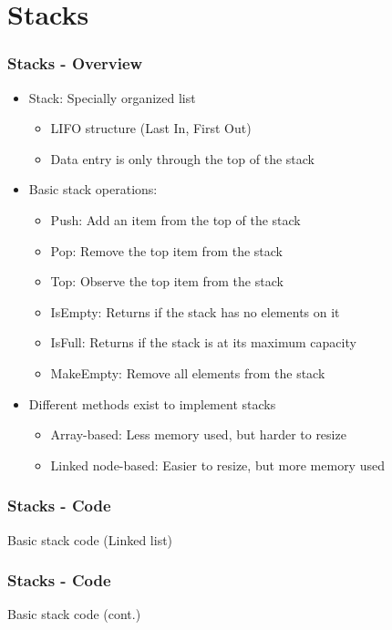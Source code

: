 \documentclass[c, aspectratio=169]{beamer}
\begin{document}
\section{Stacks}
\begin{frame}\frametitle{Stacks - Overview}
\begin{itemize}
\item Stack: Specially organized list
	\begin{itemize}
	\item LIFO structure (Last In, First Out)
	\item Data entry is only through the top of the stack
	\end{itemize}
\item Basic stack operations:
\begin{itemize}
\item Push: Add an item from the top of the stack
\item Pop: Remove the top item from the stack
\item Top: Observe the top item from the stack
\item IsEmpty: Returns if the stack has no elements on it
\item IsFull: Returns if the stack is at its maximum capacity
\item MakeEmpty: Remove all elements from the stack
\end{itemize}
\item Different methods exist to implement stacks
	\begin{itemize}
	\item Array-based: Less memory used, but harder to resize
	\item Linked node-based: Easier to resize, but more memory used
	\end{itemize}
\end{itemize}
\end{frame}

\begin{frame}\frametitle{Stacks - Code}
Basic stack code (Linked list)

%
\end{frame}

\begin{frame}\frametitle{Stacks - Code}
Basic stack code (cont.)

\end{frame}
\end{document}
